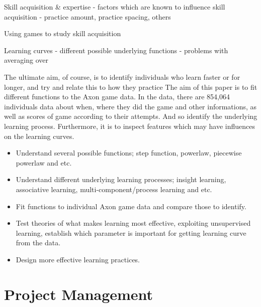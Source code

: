 \documentclass[12pt,a4paper]{report}
\begin{document}
Skill acquisition \& expertise
- factors which are known to influence skill acquisition
- practice amount, practice spacing, others

Using games to study skill acquisition

Learning curves
- different possible underlying functions
- problems with averaging over

The ultimate aim, of course, is to identify individuals who learn faster or for longer, and try and relate this to how they practice
The aim of this paper is to fit different functions to the Axon game data. In the data, there are 854,064 individuals data about when, where they did the game and other informations, as well as scores of game according to their attempts. And so identify the underlying learning process. Furthermore, it is to inspect features which may have influences on the learning curves. 

\begin{itemize}
\item Understand several possible functions; step function, powerlaw, piecewise powerlaw and etc.
\item Understand different underlying learning processes; insight learning, associative learning, multi-component/process learning and etc.
\item Fit functions to individual Axon game data and compare those to identify.
\item Test theories of what makes learning most effective, exploiting unsupervised learning, establish which parameter is important for getting learning curve from the data.
\item Design more effective learning practices.
\end{itemize}



\section{Project Management}
\end{document}
